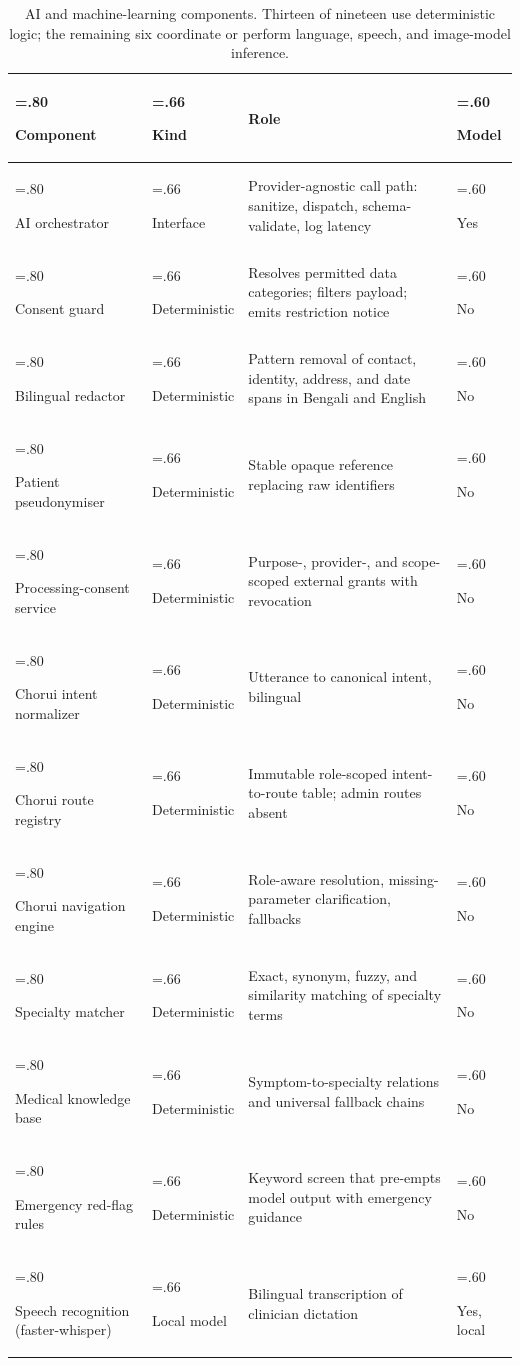 \documentclass[preprint,12pt,a4paper]{elsarticle}
\newcommand{\tablerowsep}{\midrule}
\begin{document}
\begin{table}[!htbp]
\caption{AI and machine-learning components. Thirteen of nineteen use deterministic logic;
the remaining six coordinate or perform language, speech, and image-model inference.}
\label{tab:components}
\scriptsize
\setlength{\tabcolsep}{4pt}
\begin{tabularx}{\textwidth}{@{}>{\hsize=.80\hsize\raggedright\arraybackslash}X>{\hsize=.66\hsize\raggedright\arraybackslash}X>{\hsize=1.94\hsize\raggedright\arraybackslash}X>{\hsize=.60\hsize\raggedright\arraybackslash}X@{}}
\toprule
\textbf{Component} & \textbf{Kind} & \textbf{Role} & \textbf{Model} \\
\midrule
AI orchestrator & Interface & Provider-agnostic call path: sanitize, dispatch, schema-validate, log latency & Yes \\
\tablerowsep
Consent guard & Deterministic & Resolves permitted data categories; filters payload; emits restriction notice & No \\
\tablerowsep
Bilingual redactor & Deterministic & Pattern removal of contact, identity, address, and date spans in Bengali and English & No \\
\tablerowsep
Patient pseudonymiser & Deterministic & Stable opaque reference replacing raw identifiers & No \\
\tablerowsep
Processing-consent service & Deterministic & Purpose-, provider-, and scope-scoped external grants with revocation & No \\
\tablerowsep
Chorui intent normalizer & Deterministic & Utterance to canonical intent, bilingual & No \\
\tablerowsep
Chorui route registry & Deterministic & Immutable role-scoped intent-to-route table; admin routes absent & No \\
\tablerowsep
Chorui navigation engine & Deterministic & Role-aware resolution, missing-parameter clarification, fallbacks & No \\
\tablerowsep
Specialty matcher & Deterministic & Exact, synonym, fuzzy, and similarity matching of specialty terms & No \\
\tablerowsep
Medical knowledge base & Deterministic & Symptom-to-specialty relations and universal fallback chains & No \\
\tablerowsep
Emergency red-flag rules & Deterministic & Keyword screen that pre-empts model output with emergency guidance & No \\
\tablerowsep
Speech recognition (faster-whisper) & Local model & Bilingual transcription of clinician dictation & Yes, local \\

\end{tabularx}
\end{table}
\end{document}
